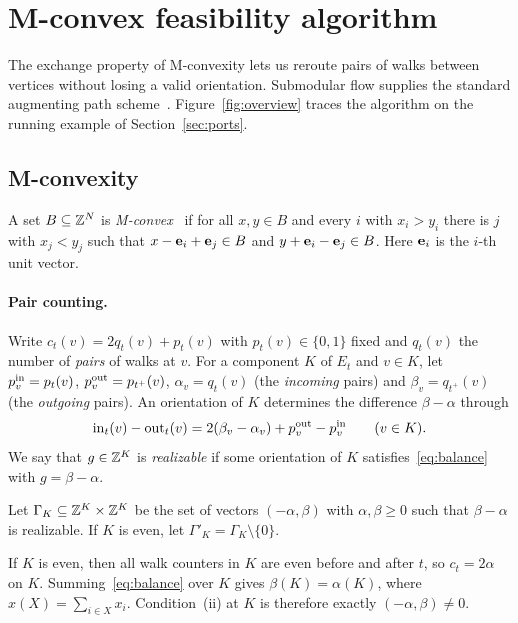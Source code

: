 \section{M-convex feasibility algorithm}\label{sec:mconvex}

The exchange property of M-convexity lets us reroute pairs of walks between vertices without losing a valid orientation. Submodular flow supplies the standard augmenting path scheme~\cite{cunningham1985,fujishige2005}. Figure~\ref{fig:overview} traces the algorithm on the running example of Section~\ref{sec:ports}.

\subsection{M-convexity}\label{sec:mcsets}

A set $B\subseteq\mathbb{Z}^N$ is \emph{M-convex}~\cite{murota1996,murota2003} if for all $x,y\in B$ and every $i$ with $x_i>y_i$ there is $j$ with $x_j<y_j$ such that $x-\mathbf{e}_i+\mathbf{e}_j\in B$ and $y+\mathbf{e}_i-\mathbf{e}_j\in B$. Here $\mathbf{e}_i$ is the $i$-th unit vector.

\paragraph{Pair counting.}
Write $c_t(v)=2q_t(v)+p_t(v)$ with $p_t(v)\in\{0,1\}$ fixed and $q_t(v)$ the number of \emph{pairs} of walks at $v$. For a component $K$ of $E_t$ and $v\in K$, let $p^{\mathrm{in}}_v=p_t(v)$, $p^{\mathrm{out}}_v=p_{t^+}(v)$, $\alpha_v=q_t(v)$ (the \emph{incoming} pairs) and $\beta_v=q_{t^+}(v)$ (the \emph{outgoing} pairs). An orientation of $K$ determines the difference $\beta-\alpha$ through
\begin{equation}\label{eq:balance}
  \mathrm{in}_t(v)-\mathrm{out}_t(v)=2(\beta_v-\alpha_v)+p^{\mathrm{out}}_v-p^{\mathrm{in}}_v\qquad (v\in K).
\end{equation}
We say that $g\in\mathbb{Z}^K$ is \emph{realizable} if some orientation of $K$ satisfies~\eqref{eq:balance} with $g=\beta-\alpha$.

\begin{definition}\label{def:gamma}
Let $\Gamma_K\subseteq\mathbb{Z}^{K}\times\mathbb{Z}^{K}$ be the set of vectors $(-\alpha,\beta)$ with $\alpha,\beta\ge0$ such that $\beta-\alpha$ is realizable. If $K$ is even, let $\Gamma'_K=\Gamma_K\setminus\{0\}$.
\end{definition}

If $K$ is even, then all walk counters in $K$ are even before and after $t$, so $c_t=2\alpha$ on $K$. Summing~\eqref{eq:balance} over $K$ gives $\beta(K)=\alpha(K)$, where $x(X)=\sum_{i\in X}x_i$. Condition~(ii) at $K$ is therefore exactly $(-\alpha,\beta)\ne0$.

